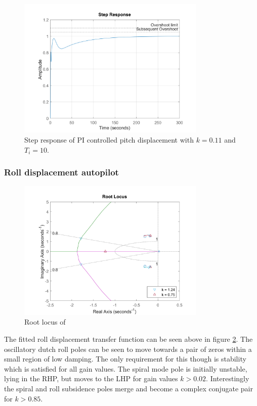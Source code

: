 \documentclass{article}
\begin{document}
\begin{figure}[H]
    \centering
    \includegraphics[width=0.8\textwidth]{figures/pitch_autopilot_compensated_step.png}
    \caption{Step response of PI controlled pitch displacement with $k=0.11$ and $T_i = 10$.}
    \label{fig:pitch_autopilot_compensated_step}
\end{figure}


\subsubsection{Roll displacement autopilot}

\begin{figure}[H]
    \centering
    \includegraphics[width=0.8\textwidth]{figures/roll_autopilot_locus_uncompensated.png}
    \caption{Root locus of }
    \label{fig:roll_autopilot_uncompensated_locus}
\end{figure}

The fitted roll displacement transfer function can be seen above in figure \ref{fig:roll_autopilot_uncompensated_locus}.
The oscillatory dutch roll poles can be seen to move towards a pair of zeros within a small region of low damping.
The only requirement for this though is stability which is satisfied for all gain values.
The spiral mode pole is initially unstable, lying in the RHP, but moves to the LHP for gain values $k > 0.02$.
Interestingly the spiral and roll subsidence poles merge and become a complex conjugate pair for $k > 0.85$.
\end{document}
